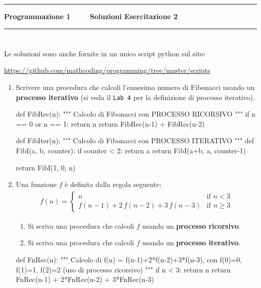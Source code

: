 \documentclass[11pt,a4]{article}
\begin{document}
\thispagestyle{empty}
\hrule
\begin{center}
   {\Large {\bf Programmazione 1 \hspace{3cm} $\quad \quad$ Soluzioni Esercitazione 2}}
\end{center}
\hrule

\section*{}
Le soluzioni sono anche fornite in un unico script python sul sito: 
\begin{center}
	\url{https://github.com/mathcoding/programming/tree/master/scripts}
\end{center}

\begin{enumerate}
\item Scrivere una procedura che calcoli l'ennesimo numero di Fibonacci usando un {\bf processo iterativo}
(si veda il {\tt Lab 4} per la definizione di processo iterativo).
\begin{python}
def FibRec(n):
    """ Calcolo di Fibonacci con PROCESSO RICORSIVO """
    if n == 0 or n == 1:
        return n
    return FibRec(n-1) + FibRec(n-2)

def FibIter(n):
    """ Calcolo di Fibonacci con PROCESSO ITERATIVO """
    def FibI(a, b, counter):
        if counter < 2:
            return a
        return FibI(a+b, a, counter-1)
    
    return FibI(1, 0, n)
\end{python}

\item Una funzione $f$ è definita dalla regola seguente:
\begin{align}
	f(n) = \left\{\begin{array}{ll} n & \mbox{if } n<3 \\ f(n-1)+2\,f(n-2)+3\,f(n-3) & \mbox{if } n \geq 3 \end{array} \right.
\end{align}
\begin{enumerate}
\item Si scriva una procedura che calcoli $f$ usando un {\bf processo ricorsivo}.
\item Si scriva una procedura che calcoli $f$ usando un {\bf processo iterativo}.
\end{enumerate}
\begin{python}
def FnRec(n):
    """ Calcolo di f(n)  = f(n-1)+2*f(n-2)+3*f(n-3), con f(0)=0, f(1)=1, f(2)=2 
        (uso di processo ricorsivo) """
    if n < 3:
        return n
    return FnRec(n-1) + 2*FnRec(n-2) + 3*FnRec(n-3)


\end{python}
\end{enumerate}
\end{document}
